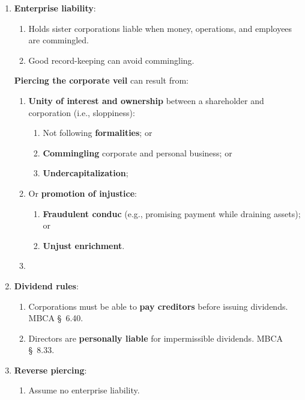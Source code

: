 \begin{enumerate}
\begin{enumerate}
        \item \textbf{Enterprise liability}:
        \begin{enumerate}
            \item Holds sister corporations liable when money, operations, and 
            employees are commingled.
            \item Good record-keeping can avoid commingling.
        \end{enumerate}
        \textbf{Piercing the corporate veil} can result from:
        \begin{enumerate}
            \item \textbf{Unity of interest and ownership} between a 
            shareholder and corporation (i.e., sloppiness):
            \begin{enumerate}
                \item Not following \textbf{formalities}; or
                \item \textbf{Commingling} corporate and personal business; or
                \item \textbf{Undercapitalization};
            \end{enumerate}
            \item Or \textbf{promotion of injustice}:
            \begin{enumerate}
                \item \textbf{Fraudulent conduc} (e.g., promising payment 
                while draining assets); or
                \item \textbf{Unjust enrichment}.
            \end{enumerate}
            \item %
        \end{enumerate}
        \item \textbf{Dividend rules}:
        \begin{enumerate}
            \item Corporations must be able to \textbf{pay creditors} before 
            issuing dividends. MBCA \S\ 6.40.
            \item Directors are \textbf{personally liable} for impermissible 
            dividends. MBCA \S\ 8.33.
        \end{enumerate}
        \item \textbf{Reverse piercing}:
        \begin{enumerate}
            \item Assume no enterprise liability.

\end{enumerate}
\end{enumerate}
\end{enumerate}
